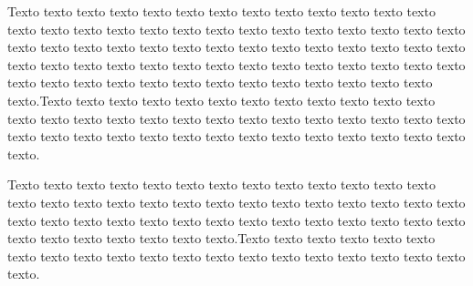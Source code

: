 Texto texto texto texto texto texto texto texto texto texto texto texto texto texto texto texto texto texto texto texto texto texto texto texto texto texto texto texto texto texto texto texto texto texto texto texto texto texto texto texto texto texto texto texto texto texto texto texto texto texto texto texto texto texto texto texto texto texto texto texto texto texto texto texto texto texto texto texto texto.Texto texto texto texto texto texto texto texto texto texto texto texto texto texto texto texto texto texto texto texto texto texto texto texto texto texto texto texto texto texto texto texto texto texto texto texto texto texto texto texto texto.

Texto texto texto texto texto texto texto texto texto texto texto texto texto texto texto texto texto texto texto texto texto texto texto texto texto texto texto texto texto texto texto texto texto texto texto texto texto texto texto texto texto texto texto texto texto texto texto texto.Texto texto texto texto texto texto texto texto texto texto texto texto texto texto texto texto texto texto texto texto texto.

